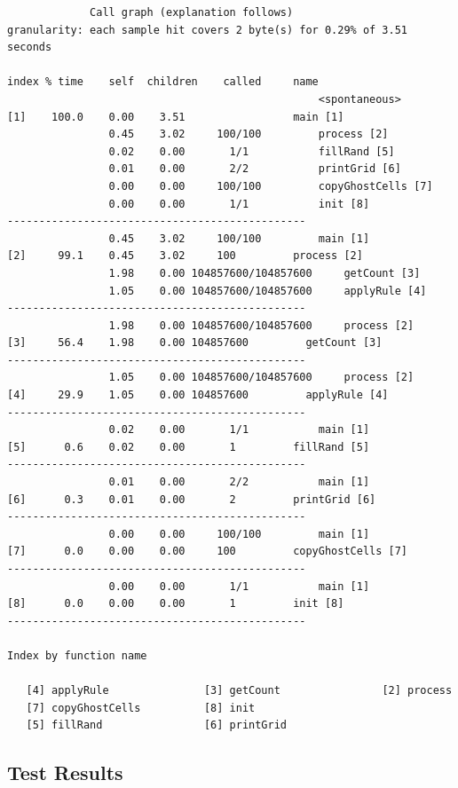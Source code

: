 \documentclass[11pt]{article} %
\begin{document}
\begin{verbatim}
		     Call graph (explanation follows)
granularity: each sample hit covers 2 byte(s) for 0.29% of 3.51 seconds

index % time    self  children    called     name
                                                 <spontaneous>
[1]    100.0    0.00    3.51                 main [1]
                0.45    3.02     100/100         process [2]
                0.02    0.00       1/1           fillRand [5]
                0.01    0.00       2/2           printGrid [6]
                0.00    0.00     100/100         copyGhostCells [7]
                0.00    0.00       1/1           init [8]
-----------------------------------------------
                0.45    3.02     100/100         main [1]
[2]     99.1    0.45    3.02     100         process [2]
                1.98    0.00 104857600/104857600     getCount [3]
                1.05    0.00 104857600/104857600     applyRule [4]
-----------------------------------------------
                1.98    0.00 104857600/104857600     process [2]
[3]     56.4    1.98    0.00 104857600         getCount [3]
-----------------------------------------------
                1.05    0.00 104857600/104857600     process [2]
[4]     29.9    1.05    0.00 104857600         applyRule [4]
-----------------------------------------------
                0.02    0.00       1/1           main [1]
[5]      0.6    0.02    0.00       1         fillRand [5]
-----------------------------------------------
                0.01    0.00       2/2           main [1]
[6]      0.3    0.01    0.00       2         printGrid [6]
-----------------------------------------------
                0.00    0.00     100/100         main [1]
[7]      0.0    0.00    0.00     100         copyGhostCells [7]
-----------------------------------------------
                0.00    0.00       1/1           main [1]
[8]      0.0    0.00    0.00       1         init [8]
-----------------------------------------------

Index by function name

   [4] applyRule               [3] getCount                [2] process
   [7] copyGhostCells          [8] init
   [5] fillRand                [6] printGrid

\end{verbatim}
\endgroup
\subsection{Test Results}
\end{document}
